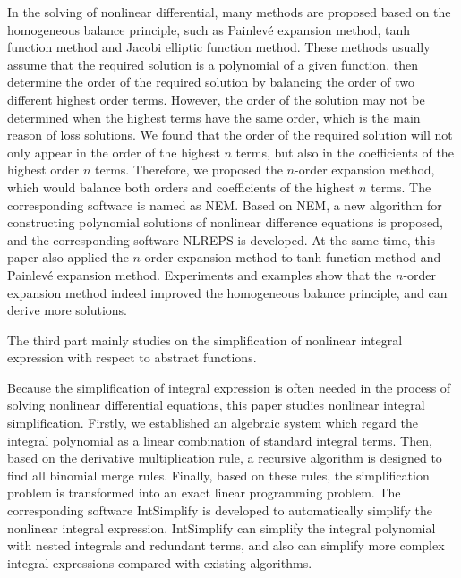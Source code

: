 In the solving of nonlinear differential, many methods are proposed based on the  homogeneous balance principle, such as Painlevé expansion method, tanh function method  and Jacobi elliptic function method. 
These methods usually assume that the required solution is a polynomial of a given function, then determine the order of the required solution by balancing the order of two different highest order terms. 
However, the order of the solution may not be determined when the highest terms have the same order, which is the main reason of loss solutions. 
We found that the order of the required solution will not only appear in the order of the highest $n$ terms, but also in the coefficients of the highest order $n$ terms. 
Therefore, we proposed the $n$-order expansion method, which would balance both orders and coefficients of the highest $n$ terms. The corresponding software is named as NEM. 
Based on NEM, a new algorithm for constructing polynomial solutions of  nonlinear difference equations is proposed, and the corresponding software NLREPS is developed. 
At the same time, this paper also applied the $n$-order expansion method to tanh function method  and Painlevé expansion method. 
Experiments and examples show that the $n$-order expansion method indeed improved the homogeneous balance principle, and can derive more solutions.

The third part mainly studies on the simplification of nonlinear integral expression with respect to abstract functions.

Because the simplification of integral expression is often needed in the process of solving nonlinear differential equations, this paper studies nonlinear integral simplification. Firstly, we established an algebraic system which  regard the integral polynomial as a linear combination of standard integral terms. Then, based on the derivative multiplication rule, a recursive algorithm is designed to find all binomial merge rules. Finally, based on these rules, the simplification problem is transformed into an exact linear programming problem. The corresponding software  IntSimplify is developed to automatically simplify the nonlinear integral expression. IntSimplify can simplify the integral polynomial with nested integrals and redundant terms, and also can simplify more complex integral expressions compared with existing algorithms.


\bigskip
{}
